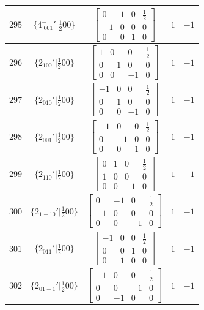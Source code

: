 \documentclass[fleqn,8pt]{jsarticle}
\begin{document}
\begin{longtable}{ccccc}
$ 295 $ & $ \{4^{-}_{\,\,001}{}'|\frac{1}{2} 0 0\} $ & $ \begin{bmatrix} 0 & 1 & 0 & \frac{1}{2} \\ -1 & 0 & 0 & 0 \\ 0 & 0 & 1 & 0 \end{bmatrix} $ & $ 1 $ & $ -1 $ \\ \hline
$ 296 $ & $ \{2{}_{100}{}'|\frac{1}{2} 0 0\} $ & $ \begin{bmatrix} 1 & 0 & 0 & \frac{1}{2} \\ 0 & -1 & 0 & 0 \\ 0 & 0 & -1 & 0 \end{bmatrix} $ & $ 1 $ & $ -1 $ \\ \hline
$ 297 $ & $ \{2{}_{010}{}'|\frac{1}{2} 0 0\} $ & $ \begin{bmatrix} -1 & 0 & 0 & \frac{1}{2} \\ 0 & 1 & 0 & 0 \\ 0 & 0 & -1 & 0 \end{bmatrix} $ & $ 1 $ & $ -1 $ \\ \hline
$ 298 $ & $ \{2{}_{001}{}'|\frac{1}{2} 0 0\} $ & $ \begin{bmatrix} -1 & 0 & 0 & \frac{1}{2} \\ 0 & -1 & 0 & 0 \\ 0 & 0 & 1 & 0 \end{bmatrix} $ & $ 1 $ & $ -1 $ \\ \hline
$ 299 $ & $ \{2{}_{110}{}'|\frac{1}{2} 0 0\} $ & $ \begin{bmatrix} 0 & 1 & 0 & \frac{1}{2} \\ 1 & 0 & 0 & 0 \\ 0 & 0 & -1 & 0 \end{bmatrix} $ & $ 1 $ & $ -1 $ \\ \hline
$ 300 $ & $ \{2{}_{1-10}{}'|\frac{1}{2} 0 0\} $ & $ \begin{bmatrix} 0 & -1 & 0 & \frac{1}{2} \\ -1 & 0 & 0 & 0 \\ 0 & 0 & -1 & 0 \end{bmatrix} $ & $ 1 $ & $ -1 $ \\ \hline
$ 301 $ & $ \{2{}_{011}{}'|\frac{1}{2} 0 0\} $ & $ \begin{bmatrix} -1 & 0 & 0 & \frac{1}{2} \\ 0 & 0 & 1 & 0 \\ 0 & 1 & 0 & 0 \end{bmatrix} $ & $ 1 $ & $ -1 $ \\ \hline
$ 302 $ & $ \{2{}_{01-1}{}'|\frac{1}{2} 0 0\} $ & $ \begin{bmatrix} -1 & 0 & 0 & \frac{1}{2} \\ 0 & 0 & -1 & 0 \\ 0 & -1 & 0 & 0 \end{bmatrix} $ & $ 1 $ & $ -1 $ \\ \hline

\end{longtable}
\end{document}
